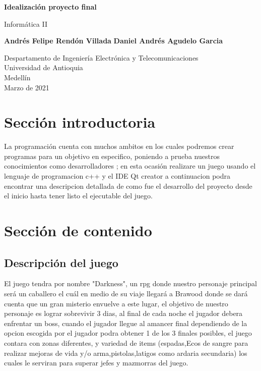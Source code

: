 \documentclass{article}
\begin{document}
\begin{titlepage}
    \begin{center}
        \vspace*{1cm}
            
        \Huge
        \textbf{Idealización proyecto final}
            
        \vspace{0.5cm}
        \LARGE
        Informática II
            
        \vspace{1.5cm}
            
        \textbf{Andrés Felipe Rendón Villada}
        \newline
        \textbf{Daniel Andrés Agudelo Garcia}
            
        \vfill
            
        \vspace{0.8cm}
            
        \Large
        Despartamento de Ingeniería Electrónica y Telecomunicaciones\\
        Universidad de Antioquia\\
        Medellín\\
        Marzo de 2021
            
    \end{center}
\end{titlepage}

\tableofcontents
\newpage
\section{Sección introductoria}\label{intro}
La programación cuenta con muchos ambitos en los cuales podremos crear programas para un objetivo en especifico, poniendo a prueba nuestros conocimientos como desarrolladores ; en esta ocasión realizare un juego usando el lenguaje de programacion c++ y el IDE Qt creator a continuacion podra encontrar una descripcion detallada de como fue el desarrollo del proyecto desde el inicio hasta tener listo el ejecutable del juego.

\section{Sección de contenido} \label{contenido}

\subsection{Descripción del juego}
El juego tendra por nombre "Darkness", un rpg donde nuestro personaje principal será un caballero el cuál en medio de su viaje llegará a Brawood donde se dará cuenta que un gran misterio envuelve a este lugar, el objetivo de nuestro personaje es lograr sobrevivir 3 dias, al final de cada noche el jugador debera enfrentar un boss, cuando el jugador llegue al amancer final dependiendo de la opcion escogida por el jugador podra obtener 1 de los 3 finales posibles, el juego contara con zonas diferentes, y variedad de items (espadas,Ecos de sangre para realizar mejoras de vida y/o arma,pistolas,latigos como ardaria secundaria) los cuales le serviran para superar jefes y mazmorras del juego.
\end{document}
